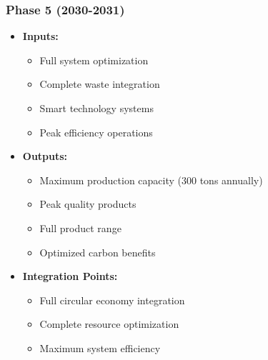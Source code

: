 \subsubsection{Phase 5 (2030-2031)}
\begin{itemize}
    \item \textbf{Inputs:}
    \begin{itemize}
        \item Full system optimization
        \item Complete waste integration
        \item Smart technology systems
        \item Peak efficiency operations
    \end{itemize}
    \item \textbf{Outputs:}
    \begin{itemize}
        \item Maximum production capacity (300 tons annually)
        \item Peak quality products
        \item Full product range
        \item Optimized carbon benefits
    \end{itemize}
    \item \textbf{Integration Points:}
    \begin{itemize}
        \item Full circular economy integration
        \item Complete resource optimization
        \item Maximum system efficiency
    \end{itemize}
\end{itemize}

